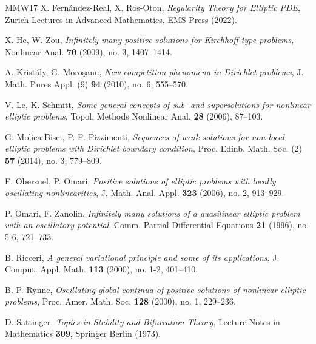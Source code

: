 \documentclass[10pt,twoside,english,reqno,a4paper]{amsart}
\theoremstyle{plain}
\theoremstyle{plain}
\theoremstyle{definition}
\theoremstyle{remark}
\numberwithin{equation}{section}
\begin{document}
\begin{thebibliography}{MMW17}
     X. Fernández-Real, X. Ros-Oton, \textit{Regularity Theory for Elliptic PDE}, Zurich Lectures in Advanced Mathematics, EMS Press (2022).

     X. He, W. Zou, \textit{Infinitely many positive solutions for Kirchhoff-type problems}, Nonlinear Anal. \textbf{70} (2009), no. 3, 1407--1414.

     A. Krist\'{a}ly, G. Moro\c{s}anu, \textit{New competition phenomena in Dirichlet problems}, J. Math. Pures Appl. (9) \textbf{94} (2010), no. 6, 555--570.

     V. Le, K. Schmitt, \textit{Some general concepts of sub- and supersolutions for nonlinear elliptic problems}, Topol. Methods Nonlinear Anal. \textbf{28} (2006), 87--103.

     G. Molica Bisci, P. F. Pizzimenti, \textit{Sequences of weak solutions for non-local elliptic problems with Dirichlet boundary condition}, Proc. Edinb. Math. Soc. (2) \textbf{57} (2014), no. 3, 779--809.

     F. Obersnel, P. Omari, \textit{Positive solutions of elliptic problems with locally oscillating nonlinearities}, J. Math. Anal. Appl. \textbf{323} (2006), no. 2, 913--929.

     P. Omari, F. Zanolin, \textit{Infinitely many solutions of a quasilinear elliptic problem with an oscillatory potential}, Comm. Partial Differential Equations \textbf{21} (1996), no. 5-6, 721--733.

     B. Ricceri, \textit{A general variational principle and some of its applications}, J. Comput. Appl. Math. \textbf{113} (2000), no. 1-2, 401--410.

     B. P. Rynne, \textit{Oscillating global continua of positive solutions of nonlinear elliptic problems}, Proc. Amer. Math. Soc. \textbf{128} (2000), no. 1, 229--236.

     D. Sattinger, \textit{Topics in Stability and Bifurcation Theory}, Lecture Notes in Mathematics \textbf{309}, Springer Berlin (1973).
\end{thebibliography}
\end{document}
